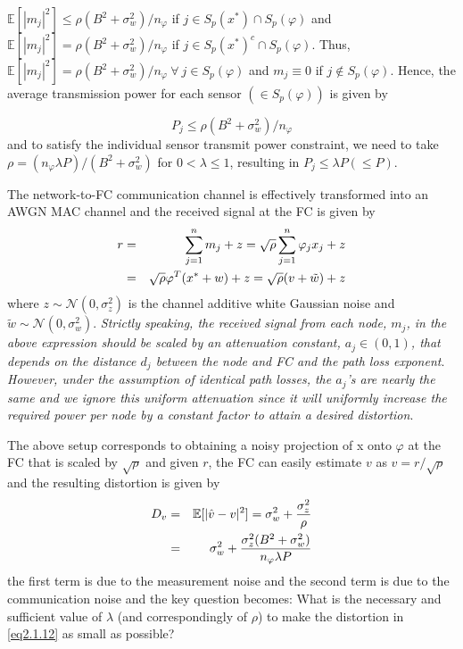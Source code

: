$\mathbb{E}[|m_j|^2] \leq \rho(B^2+\sigma_w^2)/n_{\varphi}$ if $j\in S_p(x^*) \cap S_p(\varphi)$ and $\mathbb{E}[|m_j|^2] = \rho (B^2+\sigma_w^2)/n_{\varphi}$ if $j \in S_p(x^*)^c \cap S_p(\varphi)$. Thus, $\mathbb{E}[|m_j|^2] = \rho(B^2 + \sigma_w^2)/n_{\varphi} \ \forall\ j \in S_p(\varphi)$ and $m_j \equiv 0$ if $j \notin S_p(\varphi)$. Hence, the average transmission power for each sensor $(\in S_p(\varphi))$ is given by

\begin{equation}
    P_j \leq \rho(B^2+\sigma_w^2)/n_{\varphi}
    \label{eq2.1.10}
\end{equation}
and to satisfy the individual sensor transmit power constraint, we need to take $\rho = (n_{\varphi}\lambda P)/(B^2+\sigma_w^2)$ for $0<\lambda\leq 1$, resulting in $P_j \leq \lambda P(\leq P)$. 

The network-to-FC communication channel is effectively transformed into an AWGN MAC channel and the received signal at the FC is given by
\begin{eqnarray}
    \label{eq2.1.11}
    r &=& \sum\limits_{j=1}^{n}m_j+z = \sqrt{\rho}\sum\limits_{j=1}^{n}\varphi_jx_j+z \notag \\
    &=& \sqrt{\rho}\varphi^T(x^*+w)+z = \sqrt{\rho}(v+\tilde{w})+z
\end{eqnarray}
where $z \sim \mathcal{N}(0,\sigma^2_z)$ is the channel additive white Gaussian noise and $\tilde{w} \sim \mathcal{N}(0,\sigma_w^2)$. \emph{\textcolor[rgb]{1,0,0}{Strictly speaking, the received signal from each node, $m_j$, in the above expression should be scaled by an attenuation constant, $a_j \in (0,1)$, that depends on the distance $d_j$ between the node and FC and the path loss exponent}}.
\emph{\textcolor[rgb]{0,0,1}{However, under the assumption of identical path losses, the $a_j$'s are nearly the same and we ignore this uniform attenuation since it will uniformly increase the required power per node by a constant factor to attain a desired distortion}}.

The above setup corresponds to obtaining a noisy projection of x onto $\varphi$ at the FC that is scaled by $\sqrt{\rho}$ and given $r$, the FC can easily estimate $v$ as $\hat{v} = r /\sqrt{\rho}$ and the resulting distortion is given by 
\begin{eqnarray}
    \label{eq2.1.12}
    D_v &=& \mathbb{E}[|\hat{v} - v|^2] = \sigma_w^2 + \dfrac{\sigma_z^2}{\rho} \notag \\
    &=& \sigma_w^2 + \dfrac{\sigma_z^2(B^2+\sigma_w^2)}{n_{\varphi}\lambda P}
\end{eqnarray}
the first term is due to the \textcolor[rgb]{1,0,0}{measurement noise} and the second term is due to the \textcolor[rgb]{1,0,0}{communication noise} and the key question becomes: \textcolor[rgb]{1,0,0}{What is the necessary and sufficient value of $\lambda$ (and correspondingly of $\rho$) to make the distortion in \cref{eq2.1.12} as small as possible?}

